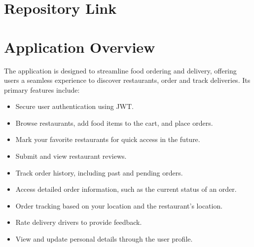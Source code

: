 \documentclass{article}
\begin{document}


\section*{Repository Link}


\section*{Application Overview}
The application is designed to streamline food ordering and delivery, offering users a seamless experience to discover restaurants, order and track deliveries. Its primary features include:
\begin{itemize}
    \item Secure user authentication using JWT.
    \item Browse restaurants, add food items to the cart, and place orders.
    \item Mark your favorite restaurants for quick access in the future.
    \item Submit and view restaurant reviews.
    \item Track order history, including past and pending orders.
    \item Access detailed order information, such as the current status of an order.
    \item Order tracking based on your location and the restaurant's location.
    \item Rate delivery drivers to provide feedback.
    \item View and update personal details through the user profile.
\end{itemize}
\end{document}

